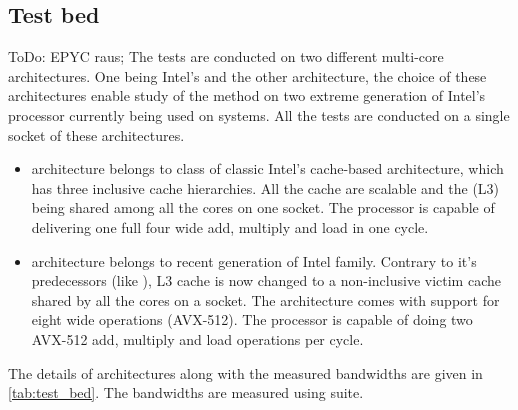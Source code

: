 \subsection{Test bed}
{\GW ToDo: EPYC raus;}
The tests are conducted on two different multi-core architectures. One being Intel's \IVB and the other \SKX architecture, the choice of these architectures enable study of the method on two extreme generation of Intel's processor currently being used on \HPC systems. All the tests are conducted on a single socket of these architectures. 

\begin{itemize}
	\item \Intel \IVB architecture belongs to class of classic Intel's cache-based architecture, which has three inclusive cache  hierarchies. All the cache are scalable and the \LLC (L3) being shared among all the cores on one socket. The processor is capable of delivering one full four wide \SIMD add, multiply and load in one cycle. 
	\item \Intel \SKX architecture belongs to recent generation of Intel family. Contrary to it's predecessors (like \IVB), L3 cache is now changed to a non-inclusive victim cache shared by all the cores on a socket. The architecture comes with support for eight wide \SIMD operations (AVX-512). The processor is capable of doing two AVX-512 add, multiply and load operations per cycle.
	\begin{comment}
	\item {\GW \AMD \EPY is based on AMD's Zen microarchitecture. The basic building block of the architecture consists of Core Complex (CCX) consisting of three cores (can extend upto four on high end models) each having it's own private L1 and L2 cache. The L3 cache is shared between a core complex and is non-inclusive victim cache. A single socket of \EPY consists of eight such CCX.}
	\end{comment}
	
\end{itemize}
The details of architectures along with the measured bandwidths are given in \cref{tab:test_bed}. {\GW The bandwidths are measured using \likwidBench suite.}

